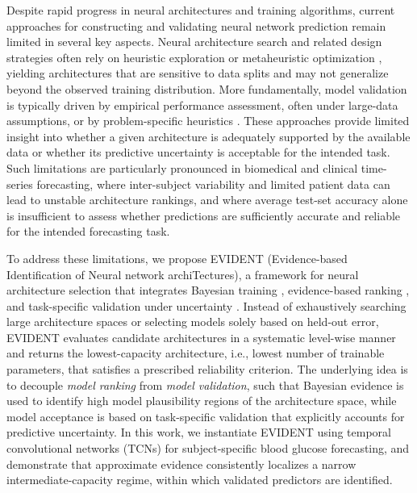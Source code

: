 \documentclass[preprint,12pt]{elsarticle}
\begin{document}
Despite rapid progress in neural architectures and training algorithms, current approaches for constructing and validating neural network prediction remain limited in several key aspects. Neural architecture search and related design strategies often rely on heuristic exploration or metaheuristic optimization \cite{elsken2019neural, wang2018hybrid, ghosh2022designing, optuna_2019, ALSABRI}, yielding architectures that are sensitive to data splits and may not generalize beyond the observed training distribution. More fundamentally, model validation is typically driven by empirical performance assessment, often under large-data assumptions, or by problem-specific heuristics \cite{yaseen2023quantification, twomey1997validation, arzani2023interpreting, samek2021explaining, zhong2022explainable}. These approaches provide limited insight into whether a given architecture is adequately supported by the available data or whether its predictive uncertainty is acceptable for the intended task. Such limitations are particularly pronounced in biomedical and clinical time-series forecasting, where inter-subject variability and limited patient data can lead to unstable architecture rankings, and where average test-set accuracy alone is insufficient to assess whether predictions are sufficiently accurate and reliable for the intended forecasting task.


To address these limitations, we propose EVIDENT (Evidence-based Identification of Neural network archiTectures), a framework for neural architecture selection that integrates Bayesian training \cite{li2025federated, jantre2021layer, mackay1995probable, islam2024predicting,sevilla2024bayesian}, evidence-based ranking \cite{immer2021scalable, tan2022toward}, and task-specific validation under uncertainty \cite{singh2024framework, oden2017predictive}. Instead of exhaustively searching large architecture spaces or selecting models solely based on held-out error, EVIDENT evaluates candidate architectures in a systematic level-wise manner and returns the lowest-capacity architecture, i.e., lowest number of trainable parameters, that satisfies a prescribed reliability criterion. 
The underlying idea is to decouple \textit{model ranking} from \textit{model validation}, such that Bayesian evidence is used to identify high model plausibility regions of the architecture space, while model acceptance is based on task-specific validation that explicitly accounts for predictive uncertainty. In this work, we instantiate EVIDENT using temporal convolutional networks (TCNs) for subject-specific blood glucose forecasting, and demonstrate that approximate evidence consistently localizes a narrow intermediate-capacity regime, within which validated predictors are identified.
\end{document}
